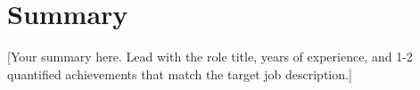 
\section{Summary}
[Your summary here. Lead with the role title, years of experience, and 1-2 quantified
achievements that match the target job description.]
